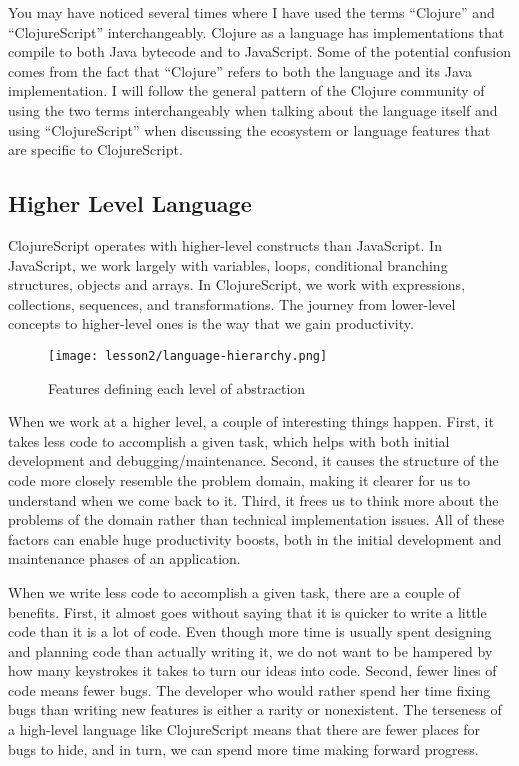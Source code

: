 \documentclass[10pt,twoside,openright]{memoir}
\begin{document}
\begin{notice}[title={Clojure(Script)}]
You may have noticed several times where I have used the terms
``Clojure'' and ``ClojureScript'' interchangeably. Clojure as a language
has implementations that compile to both Java bytecode and to
JavaScript. Some of the potential confusion comes from the fact that
``Clojure'' refers to both the language and its Java implementation. I
will follow the general pattern of the Clojure community of using the
two terms interchangeably when talking about the language itself and
using ``ClojureScript'' when discussing the ecosystem or language
features that are specific to ClojureScript.
\end{notice}

\subsection{Higher Level Language}

ClojureScript operates with higher-level constructs than JavaScript. In
JavaScript, we work largely with variables, loops, conditional branching
structures, objects and arrays. In ClojureScript, we work with
expressions, collections, sequences, and transformations. The journey
from lower-level concepts to higher-level ones is the way that we gain
productivity.

\begin{figure}[H]
\caption{Features defining each level of abstraction}
\centering
\texttt{[image: lesson2/language-hierarchy.png]}
\end{figure}

When we work at a higher level, a couple of interesting things happen.
First, it takes less code to accomplish a given task, which helps with
both initial development and debugging/maintenance. Second, it causes
the structure of the code more closely resemble the problem domain,
making it clearer for us to understand when we come back to it. Third,
it frees us to think more about the problems of the domain rather than
technical implementation issues. All of these factors can enable huge
productivity boosts, both in the initial development and maintenance
phases of an application.

When we write less code to accomplish a given task, there are a couple
of benefits. First, it almost goes without saying that it is quicker to
write a little code than it is a lot of code. Even though more time is
usually spent designing and planning code than actually writing it, we
do not want to be hampered by how many keystrokes it takes to turn our
ideas into code. Second, fewer lines of code means fewer bugs. The
developer who would rather spend her time fixing bugs than writing new
features is either a rarity or nonexistent. The terseness of a
high-level language like ClojureScript means that there are fewer places
for bugs to hide, and in turn, we can spend more time making forward
progress.
\end{document}
